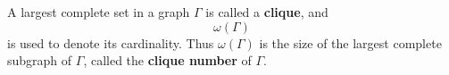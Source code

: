 A largest complete set in a graph $\Gamma$ is called a \textbf{clique}, and
$$\omega(\Gamma)$$
is used to denote its cardinality. Thus $\omega(\Gamma)$ is the size of the largest complete subgraph of $\Gamma$, called the \textbf{clique number} of $\Gamma$.
